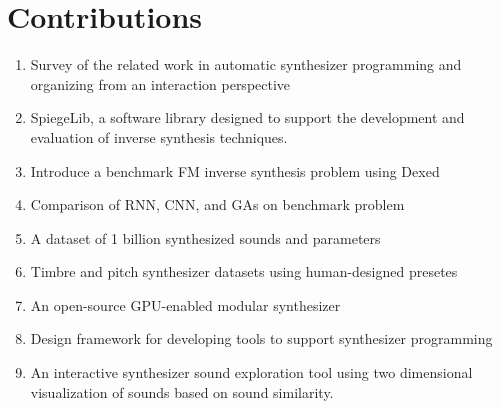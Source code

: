 \section{Contributions}
\begin{enumerate}
    \item Survey of the related work in automatic synthesizer programming and organizing from an interaction perspective
    \item SpiegeLib, a software library designed to support the development and evaluation of inverse synthesis techniques.
    \item Introduce a benchmark FM inverse synthesis problem using Dexed
    \item Comparison of RNN, CNN, and GAs on benchmark problem
    \item A dataset of 1 billion synthesized sounds and parameters
    \item Timbre and pitch synthesizer datasets using human-designed presetes
    \item An open-source GPU-enabled modular synthesizer
    \item Design framework for developing tools to support synthesizer programming
    \item An interactive synthesizer sound exploration tool using two dimensional visualization of sounds based on sound similarity.
\end{enumerate}

